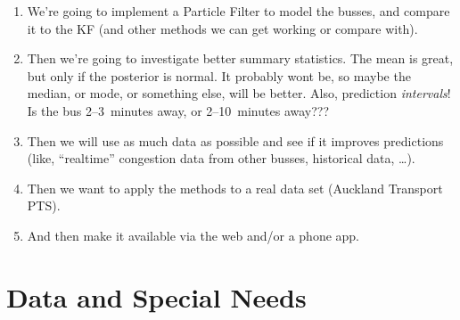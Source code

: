 \documentclass[12pt,a4paper]{article}
\begin{document}
\begin{enumerate}
\item 
  We're going to implement a Particle Filter to model the busses,
  and compare it to the KF (and other methods we can get working or compare with).


\item 
  Then we're going to investigate better summary statistics.
  The mean is great, but only if the posterior is normal.
  It probably wont be, so maybe the median, or mode, or something else, will be better.
  Also, prediction \emph{intervals}! Is the bus 2--3~minutes away, or 2--10~minutes away???

\item 
  Then we will use as much data as possible and see if it improves predictions 
  (like, ``realtime'' congestion data from other busses, historical data, \ldots).

\item 
  Then we want to apply the methods to a real data set (Auckland Transport PTS).

\item 
  And then make it available via the web and/or a phone app.

\end{enumerate}







\section{Data and Special Needs}
\label{sec:data}








\end{document}
